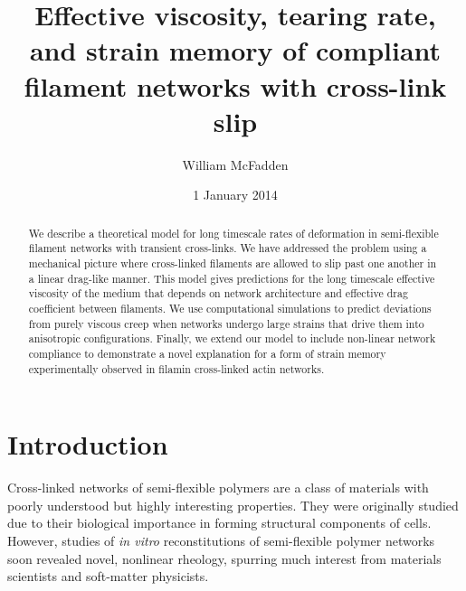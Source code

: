 \documentclass[pre,reprint]{revtex4-1}
\begin{document}
\title{Effective viscosity, tearing rate, and strain memory of compliant filament networks with cross-link slip}
\author{William McFadden}

\date{1 January 2014}

\begin{abstract}
We describe a theoretical model for long timescale rates of deformation in semi-flexible filament networks with transient cross-links.  We have addressed the problem using a mechanical picture where cross-linked filaments are allowed to slip past one another in a linear drag-like manner.  This model gives predictions for the long timescale effective viscosity of the medium that depends on network architecture and effective drag coefficient between filaments.  We use computational simulations to predict deviations from purely viscous creep when networks undergo large strains that drive them into anisotropic configurations.  Finally, we extend our model to include non-linear network compliance to demonstrate a novel explanation for a form of strain memory experimentally observed in filamin cross-linked actin networks.
\end{abstract}

\maketitle


\tableofcontents


















\section{Introduction}

Cross-linked networks of semi-flexible polymers are a class of materials with poorly understood but highly interesting properties.  They were originally studied due to their biological importance in forming structural components of cells\cite{cellmech_review1,cellmech_review2}.  However, studies of {\em in vitro} reconstitutions of semi-flexible polymer networks soon revealed novel, nonlinear rheology, spurring much interest from materials scientists and soft-matter physicists\cite{megareview}.  
\end{document}
